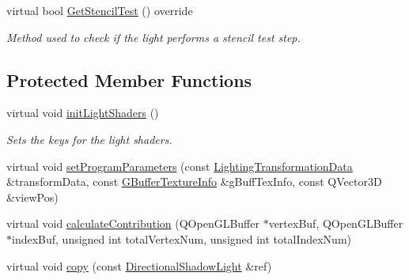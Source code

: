 \begin{DoxyCompactItemize}
\item 
\mbox{\label{class_geometry_engine_1_1_geometry_world_item_1_1_geometry_light_1_1_directional_shadow_light_aacf885a58ec3d016e92e85377b3e2adb}} 
virtual bool \mbox{\hyperlink{class_geometry_engine_1_1_geometry_world_item_1_1_geometry_light_1_1_directional_shadow_light_aacf885a58ec3d016e92e85377b3e2adb}{Get\+Stencil\+Test}} () override
\begin{DoxyCompactList}\small\item\em Method used to check if the light performs a stencil test step. \end{DoxyCompactList}\end{DoxyCompactItemize}
\subsection*{Protected Member Functions}
\begin{DoxyCompactItemize}
\item 
\mbox{\label{class_geometry_engine_1_1_geometry_world_item_1_1_geometry_light_1_1_directional_shadow_light_a3e31cf04dc9387c4c66a2a958c7281c7}} 
virtual void \mbox{\hyperlink{class_geometry_engine_1_1_geometry_world_item_1_1_geometry_light_1_1_directional_shadow_light_a3e31cf04dc9387c4c66a2a958c7281c7}{init\+Light\+Shaders}} ()
\begin{DoxyCompactList}\small\item\em Sets the keys for the light shaders. \end{DoxyCompactList}\item 
virtual void \mbox{\hyperlink{class_geometry_engine_1_1_geometry_world_item_1_1_geometry_light_1_1_directional_shadow_light_a9eb42440febb19231e71555f7fde2346}{set\+Program\+Parameters}} (const \mbox{\hyperlink{class_geometry_engine_1_1_lighting_transformation_data}{Lighting\+Transformation\+Data}} \&transform\+Data, const \mbox{\hyperlink{class_geometry_engine_1_1_g_buffer_texture_info}{G\+Buffer\+Texture\+Info}} \&g\+Buff\+Tex\+Info, const Q\+Vector3D \&view\+Pos)
\item 
virtual void \mbox{\hyperlink{class_geometry_engine_1_1_geometry_world_item_1_1_geometry_light_1_1_directional_shadow_light_a712d0b0a0573ebd246a4a8aa6b2b667a}{calculate\+Contribution}} (Q\+Open\+G\+L\+Buffer $\ast$vertex\+Buf, Q\+Open\+G\+L\+Buffer $\ast$index\+Buf, unsigned int total\+Vertex\+Num, unsigned int total\+Index\+Num)
\item 
virtual void \mbox{\hyperlink{class_geometry_engine_1_1_geometry_world_item_1_1_geometry_light_1_1_directional_shadow_light_a9dfe76fbcd9c6f7047d99d7eff78c6a5}{copy}} (const \mbox{\hyperlink{class_geometry_engine_1_1_geometry_world_item_1_1_geometry_light_1_1_directional_shadow_light}{Directional\+Shadow\+Light}} \&ref)
\end{DoxyCompactItemize}
